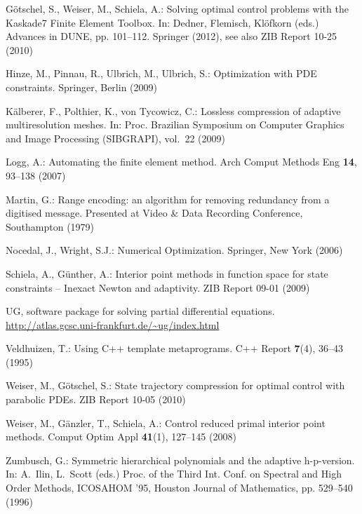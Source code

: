 \begin{thebibliography}{10}
G\"{o}tschel, S., Weiser, M., Schiela, A.: Solving optimal control problems 
with the Kaskade7 Finite Element Toolbox.
\newblock In: Dedner, Flemisch, Kl\"{o}fkorn (eds.) Advances in DUNE, pp. 101--112.
Springer (2012), see also ZIB Report 10-25 (2010)

Hinze, M., Pinnau, R., Ulbrich, M., Ulbrich, S.: Optimization with {PDE}
  constraints.
\newblock Springer, Berlin (2009)

K\"{a}lberer, F., Polthier, K., von Tycowicz, C.: Lossless compression of
  adaptive multiresolution meshes.
\newblock In: Proc. Brazilian Symposium on Computer Graphics and Image
  Processing (SIBGRAPI), vol.~22 (2009)

Logg, A.: Automating the finite element method.
\newblock Arch Comput Methods Eng \textbf{14}, 93--138 (2007)

Martin, G.: Range encoding: an algorithm for removing redundancy from a
  digitised message.
\newblock Presented at Video \& Data Recording Conference, Southampton (1979)

Nocedal, J., Wright, S.J.: Numerical Optimization.
\newblock Springer, New York (2006)

Schiela, A., G\"unther, A.: Interior point methods in function space for state
  constraints -- {I}nexact {N}ewton and adaptivity.
\newblock ZIB Report 09-01 (2009)

UG, software package for solving partial differential equations.
\newblock \url{http://atlas.gcsc.uni-frankfurt.de/~ug/index.html}

Veldhuizen, T.: Using {C++} template metaprograms.
\newblock C++ Report \textbf{7}(4), 36--43 (1995)

Weiser, M., G\"{o}tschel, S.: State trajectory compression for optimal control
  with parabolic {PDEs}.
\newblock ZIB Report 10-05 (2010)

Weiser, M., Gänzler, T., Schiela, A.: Control reduced primal interior point
  methods.
\newblock Comput Optim Appl \textbf{41}(1), 127--145 (2008)

Zumbusch, G.: Symmetric hierarchical polynomials and the adaptive h-p-version.
\newblock In: A.~Ilin, L.~Scott (eds.) Proc. of the Third Int. Conf. on
  Spectral and High Order Methods, ICOSAHOM '95, Houston Journal of
  Mathematics, pp. 529--540 (1996)

\end{thebibliography}
